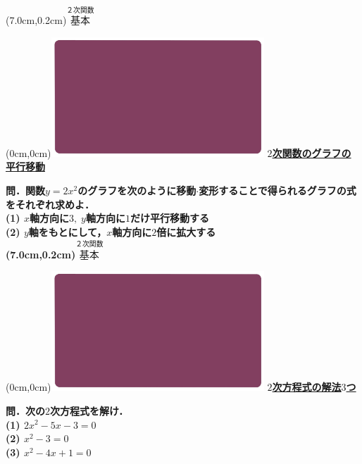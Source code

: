 \documentclass[10pt,
fleqn,
dvipdfmx,
uplatex
]{jsarticle}
\begin{document}
\at(7.0cm,0.2cm){\small\color{bradorange}$\overset{\text{２次関数}}{\text{基本}}$}


\newpage



\at(0cm,0cm){\includegraphics[width=8cm,bb=0 0 1920 1080]{./youtube/thumbnails/templates/smart_background/２次関数.jpeg}}
{\color{orange}\bf\boldmath\Large\underline{$2$次関数のグラフの平行移動}}\vspace{0.3zw}

\normalsize 
\bf\boldmath 問．関数$y=2x^2$のグラフを次のように移動$\cdot$変形することで得られるグラフの式をそれぞれ求めよ．\\
(1)  $x$軸方向に$3,\;y$軸方向に$1$だけ平行移動する\\
(2)  $y$軸をもとにして，$x$軸方向に$2$倍に拡大する\\

\at(7.0cm,0.2cm){\small\color{bradorange}$\overset{\text{２次関数}}{\text{基本}}$}


\newpage



\at(0cm,0cm){\includegraphics[width=8cm,bb=0 0 1920 1080]{./youtube/thumbnails/templates/smart_background/２次関数.jpeg}}
{\color{orange}\bf\boldmath\LARGE\underline{$2$次方程式の解法$3$つ}}\vspace{0.3zw}

\Large 
\bf\boldmath 問．次の$2$次方程式を解け．\\
(1)  $2x^2-5x-3=0$\\
(2)  $x^2-3=0$\\
(3)  $x^2-4x+1=0$\\
\end{document}
